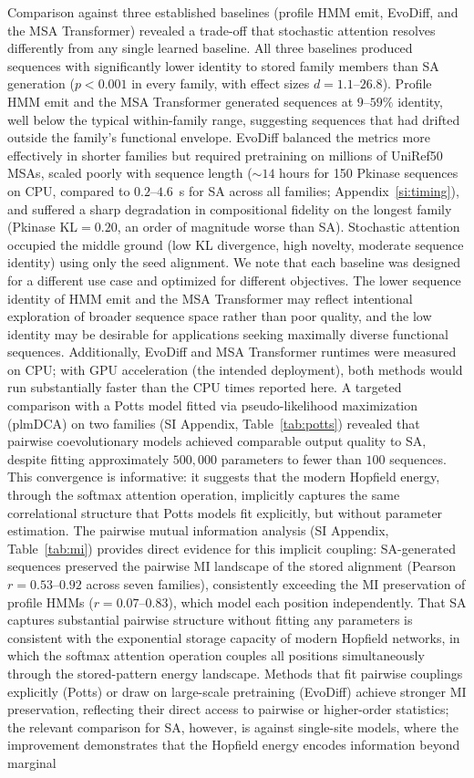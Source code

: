 Comparison against three established baselines (profile HMM emit, EvoDiff, and the MSA Transformer) revealed a trade-off that stochastic attention resolves differently from any single learned baseline. All three baselines produced sequences with significantly lower identity to stored family members than SA generation ($p < 0.001$ in every family, with effect sizes $d = 1.1$--$26.8$). Profile HMM emit and the MSA Transformer generated sequences at $9$--$59\%$ identity, well below the typical within-family range, suggesting sequences that had drifted outside the family's functional envelope. EvoDiff balanced the metrics more effectively in shorter families but required pretraining on millions of UniRef50 MSAs, scaled poorly with sequence length (${\sim}14$ hours for 150 Pkinase sequences on CPU, compared to $0.2$--$4.6$~s for SA across all families; Appendix~\ref{si:timing}), and suffered a sharp degradation in compositional fidelity on the longest family (Pkinase KL${=}0.20$, an order of magnitude worse than SA). Stochastic attention occupied the middle ground (low KL divergence, high novelty, moderate sequence identity) using only the seed alignment. We note that each baseline was designed for a different use case and optimized for different objectives. The lower sequence identity of HMM emit and the MSA Transformer may reflect intentional exploration of broader sequence space rather than poor quality, and the low identity may be desirable for applications seeking maximally diverse functional sequences. Additionally, EvoDiff and MSA Transformer runtimes were measured on CPU; with GPU acceleration (the intended deployment), both methods would run substantially faster than the CPU times reported here. A targeted comparison with a Potts model fitted via pseudo-likelihood maximization (plmDCA) on two families (SI Appendix, Table~\ref{tab:potts}) revealed that pairwise coevolutionary models achieved comparable output quality to SA, despite fitting approximately $500{,}000$ parameters to fewer than $100$ sequences. This convergence is informative: it suggests that the modern Hopfield energy, through the softmax attention operation, implicitly captures the same correlational structure that Potts models fit explicitly, but without parameter estimation. The pairwise mutual information analysis (SI Appendix, Table~\ref{tab:mi}) provides direct evidence for this implicit coupling: SA-generated sequences preserved the pairwise MI landscape of the stored alignment (Pearson $r{=}0.53$--$0.92$ across seven families), consistently exceeding the MI preservation of profile HMMs ($r{=}0.07$--$0.83$), which model each position independently. That SA captures substantial pairwise structure without fitting any parameters is consistent with the exponential storage capacity of modern Hopfield networks, in which the softmax attention operation couples all positions simultaneously through the stored-pattern energy landscape. Methods that fit pairwise couplings explicitly (Potts) or draw on large-scale pretraining (EvoDiff) achieve stronger MI preservation, reflecting their direct access to pairwise or higher-order statistics; the relevant comparison for SA, however, is against single-site models, where the improvement demonstrates that the Hopfield energy encodes information beyond marginal 
